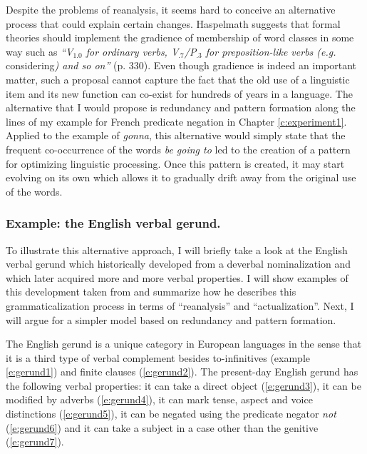 Despite the problems of reanalysis, it seems hard to conceive an alternative process that could explain certain changes. Haspelmath suggests that formal theories should implement the gradience of membership of word classes in some way such as {\em ``V$_{1.0}$ for ordinary verbs, V$_{.7}$/P$_{.3}$ for preposition-like verbs (e.g.} considering{\em) and so on''} (p. 330). Even though gradience is indeed an important matter, such a proposal cannot capture the fact that the old use of a linguistic item and its new function can co-exist for hundreds of years in a language. The alternative that I would propose is  redundancy and pattern formation along the lines of my example for French predicate negation in Chapter \ref{c:experiment1}. Applied to the example of {\em gonna}, this alternative would simply state that the frequent co-occurrence of the words {\em be going to} led to the creation of a pattern for optimizing linguistic processing. Once this pattern is created, it may start evolving on its own which allows it to gradually drift away from the original use of the words.


\subsubsection{Example: the English verbal gerund.} 
To illustrate this alternative approach, I will briefly take a look at the English verbal gerund which historically developed from a deverbal nominalization and which later acquired more and more verbal properties. I will show examples of this development taken from \citet{fanego04reanalysis} and summarize how he describes this grammaticalization process in terms of ``reanalysis'' and ``actualization''. Next, I will argue for a simpler model based on  redundancy and pattern formation.

The English gerund is a unique category in European languages in the sense that it is a third type of verbal complement besides  to-infinitives (example \ref{e:gerund1}) and finite clauses (\ref{e:gerund2}). The present-day English gerund has the following verbal properties: it can take a direct object (\ref{e:gerund3}), it can be modified by adverbs (\ref{e:gerund4}), it can mark tense, aspect and voice distinctions (\ref{e:gerund5}), it can be negated using the predicate negator {\em not} (\ref{e:gerund6}) and it can take a subject in a case other than the genitive (\ref{e:gerund7}).

